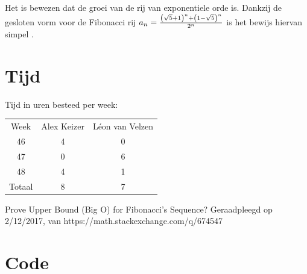 \documentclass[13pt]{article}
\begin{document}
Het is bewezen dat de groei van de rij van exponentiele orde is. Dankzij de gesloten vorm voor de Fibonacci rij $a_n={{\left(\sqrt{5}+1\right)^{n}+\left(1-\sqrt{5}\right)^{n}}\over{2^{n}}}$ is het bewijs hiervan simpel \cite{proof}.

\section{Tijd}

Tijd in uren besteed per week:

\begin{center}
\begin{tabular}{ |c|c|c| }
\hline
Week & Alex Keizer & L\'{e}on van Velzen \\
46 & 4 & 0 \\
47 & 0 & 6 \\
48 & 4 & 1 \\ 
\hline
Totaal & 8 & 7 \\
\hline
\end{tabular}
\end{center}

\begin{thebibliography}{9}
     Prove Upper Bound (Big O) for Fibonacci's Sequence? Geraadpleegd op 2/12/2017, van https://math.stackexchange.com/q/674547
\end{thebibliography}

\section{Code}


\end{document}
